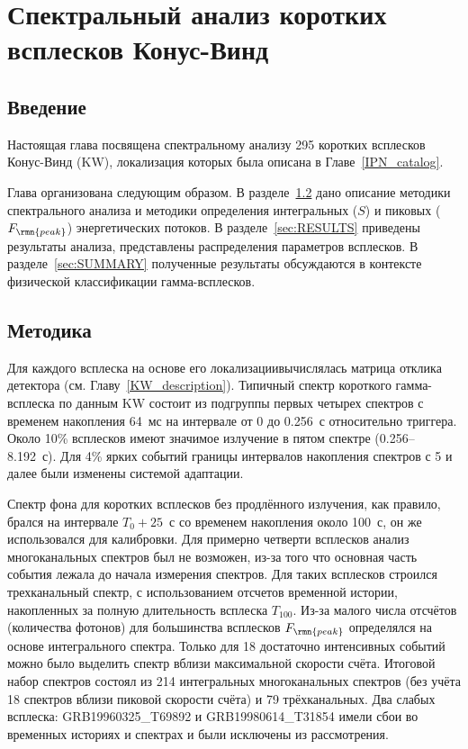 \chapter{Спектральный анализ коротких всплесков Конус-Винд} \label{sGRB_spectral_catalog}
\section{Введение}
Настоящая глава посвящена спектральному анализу 295 коротких всплесков Конус-Винд (KW),
локализация которых была описана в Главе~\ref{IPN_catalog}. 


Глава организована следующим образом.
В разделе~\ref{sec:DATA ANALYSIS} дано описание методики спектрального анализа и
методики определения интегральных ($S$) и пиковых ($F_\rmn{peak}$) энергетических потоков.
В разделе~\ref{sec:RESULTS} приведены результаты анализа, представлены распределения параметров всплесков.
В разделе~\ref{sec:SUMMARY} полученные результаты обсуждаются в контексте физической 
классификации гамма-всплесков.

\section{Методика}\label{sec:DATA ANALYSIS}
Для каждого всплеска на основе его локализации\footnotemark вычислялась матрица отклика детектора
(см. Главу~\ref{KW_description}).
Типичный спектр короткого гамма-всплеска по данным KW состоит из подгруппы первых 
четырех спектров с временем накопления 64~мс на интервале 
от 0 до 0.256~с относительно триггера. Около 10\% всплесков имеют значимое 
излучение в пятом спектре (0.256--8.192~с). Для 4\% ярких событий
границы интервалов накопления спектров с 5 и далее были изменены системой адаптации.


Спектр фона для коротких всплесков без продлённого излучения, как правило, 
брался на интервале $T_0+25$~с со временем накопления около 100~с, он же использовался для калибровки.
Для примерно четверти всплесков анализ многоканальных спектров был не возможен, из-за того 
что основная часть события лежала до начала измерения спектров. 
Для таких всплесков строился трехканальный спектр, с использованием отсчетов временной истории, 
накопленных за полную длительность всплеска $T_{100}$.
Из-за малого числа отсчётов (количества фотонов) для большинства всплесков 
$F_\rmn{peak}$ определялся на основе интегрального спектра. 
Только для 18 достаточно интенсивных событий можно было выделить спектр вблизи 
максимальной скорости счёта.
Итоговой набор спектров состоял из 214 интегральных многоканальных спектров 
(без учёта 18 спектров вблизи пиковой скорости счёта) и 79 трёхканальных. 
Два слабых всплеска: GRB19960325\_T69892 и GRB19980614\_T31854 имели сбои во 
временных историях и спектрах и были исключены из рассмотрения.

